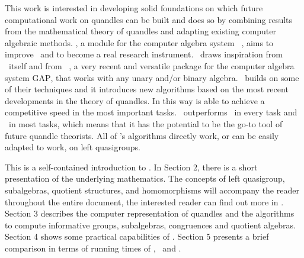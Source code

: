 This work is interested in developing solid foundations on which future computational work on quandles can be built and does so by combining results from the mathematical theory of quandles and adapting existing computer algebraic methods. 
\Software, a module for the computer algebra system \magma~\cite{BOSMA1997235}, aims to improve \rig~and to become a real research instrument. \Software~draws inspiration from \rig~itself and from \cream~\cite{Araujo2022CREAMAP}, a very recent and versatile package for the computer algebra system \textsc{GAP}, that works with any unary and/or binary algebra.\newline \Software~ builds on some of their techniques and it introduces new algorithms based on the most recent developments in the theory of quandles. In this way is able to achieve a competitive speed in the most important tasks. \Software~outperforms \rig~in every task and \cream~in most tasks, which means that it has the potential to be the go-to tool of future quandle theorists. All of \Software's algorithms directly work, or can be easily adapted to work, on left quasigroups. \newline

This is a self-contained introduction to \Software. In Section 2, there is a short presentation of the underlying mathematics. The concepts of left quasigroup, subalgebras, quotient structures, and homomorphisms will accompany the reader throughout the entire document, the interested reader can find out more in \cite{burris1981course, elhamdadi2015quandles, phdStanov}. Section 3 describes the computer representation of quandles and the algorithms to compute informative groups, subalgebras, congruences and quotient algebras. Section 4 shows some practical capabilities of \Software. Section 5 presents a brief comparison in terms of running times of \Software, \rig~and \cream. 





